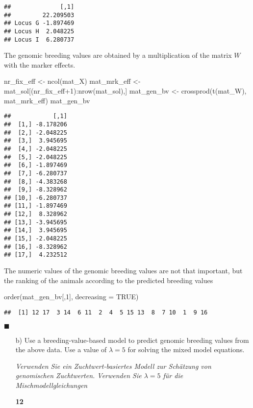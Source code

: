 \documentclass[
]{article}
\newenvironment{Shaded}{\begin{snugshade}}{\end{snugshade}}
\newcommand{\AttributeTok}[1]{\textcolor[rgb]{0.77,0.63,0.00}{#1}}
\newcommand{\ConstantTok}[1]{\textcolor[rgb]{0.00,0.00,0.00}{#1}}
\newcommand{\DecValTok}[1]{\textcolor[rgb]{0.00,0.00,0.81}{#1}}
\newcommand{\FunctionTok}[1]{\textcolor[rgb]{0.00,0.00,0.00}{#1}}
\newcommand{\NormalTok}[1]{#1}
\newcommand{\OtherTok}[1]{\textcolor[rgb]{0.56,0.35,0.01}{#1}}
\newcommand{\SpecialCharTok}[1]{\textcolor[rgb]{0.00,0.00,0.00}{#1}}
\newcommand{\points}[1]
{\begin{flushright}\textbf{#1}\end{flushright}}
\newcommand{\solend}
{\vspace{2ex}$\blacksquare$}
\begin{document}
\begin{verbatim}
##              [,1]
##         22.209503
## Locus G -1.897469
## Locus H  2.048225
## Locus I  6.280737
\end{verbatim}

The genomic breeding values are obtained by a multiplication of the
matrix \(W\) with the marker effects.

\begin{Shaded}
\begin{Highlighting}[]
\NormalTok{nr\_fix\_eff }\OtherTok{\textless{}{-}} \FunctionTok{ncol}\NormalTok{(mat\_X)}
\NormalTok{mat\_mrk\_eff }\OtherTok{\textless{}{-}}\NormalTok{ mat\_sol[(nr\_fix\_eff}\SpecialCharTok{+}\DecValTok{1}\NormalTok{)}\SpecialCharTok{:}\FunctionTok{nrow}\NormalTok{(mat\_sol),]}
\NormalTok{mat\_gen\_bv }\OtherTok{\textless{}{-}} \FunctionTok{crossprod}\NormalTok{(}\FunctionTok{t}\NormalTok{(mat\_W), mat\_mrk\_eff)}
\NormalTok{mat\_gen\_bv}
\end{Highlighting}
\end{Shaded}

\begin{verbatim}
##            [,1]
##  [1,] -8.178206
##  [2,] -2.048225
##  [3,]  3.945695
##  [4,] -2.048225
##  [5,] -2.048225
##  [6,] -1.897469
##  [7,] -6.280737
##  [8,] -4.383268
##  [9,] -8.328962
## [10,] -6.280737
## [11,] -1.897469
## [12,]  8.328962
## [13,] -3.945695
## [14,]  3.945695
## [15,] -2.048225
## [16,] -8.328962
## [17,]  4.232512
\end{verbatim}

The numeric values of the genomic breeding values are not that
important, but the ranking of the animals according to the predicted
breeding values

\begin{Shaded}
\begin{Highlighting}[]
\FunctionTok{order}\NormalTok{(mat\_gen\_bv[,}\DecValTok{1}\NormalTok{], }\AttributeTok{decreasing =} \ConstantTok{TRUE}\NormalTok{)}
\end{Highlighting}
\end{Shaded}

\begin{verbatim}
##  [1] 12 17  3 14  6 11  2  4  5 15 13  8  7 10  1  9 16
\end{verbatim}

\solend

\clearpage
\pagebreak

\begin{enumerate}
\item[b)] Use a breeding-value-based model to predict genomic breeding values from the above data. Use a value of $\lambda = 5$ for solving the mixed model equations.

\textit{Verwenden Sie ein Zuchtwert-basiertes Modell zur Schätzung von genomischen Zuchtwerten. Verwenden Sie $\lambda = 5$ für die Mischmodellgleichungen}
\points{12}
\end{enumerate}
\end{document}
